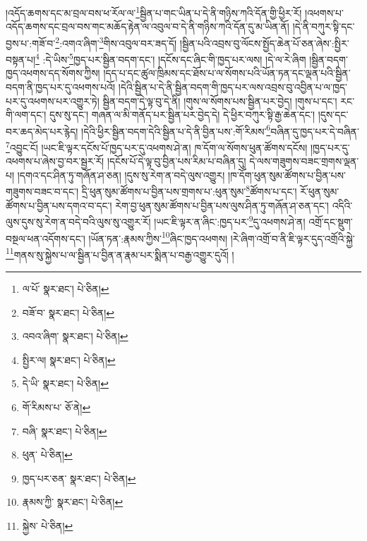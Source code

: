 །འདོད་ཆགས་དང་མ་བྲལ་བས་ཕ་རོལ་ལ་\footnote{ལ་པོ་  སྣར་ཐང་།  པེ་ཅིན། }སྦྱིན་པ་གང་ཡིན་པ་དེ་ནི་གཉིས་ཀའི་དོན་གྱི་ཕྱིར་རོ། །འཕགས་པ་འདོད་ཆགས་དང་བྲལ་བས་གང་མཆོད་རྟེན་ལ་འབུལ་བ་དེ་ནི་གཉིས་ཀའི་དོན་དུ་མ་ཡིན་ནོ། །དེ་ནི་བཀུར་སྟི་དང་བྱས་པ་:གཟོ་བ་\footnote{བཟོ་བ་  སྣར་ཐང་།  པེ་ཅིན། }:འགའ་ཞིག་\footnote{འབའ་ཞིག་  སྣར་ཐང་།  པེ་ཅིན། }གིས་འབུལ་བར་ཟད་དོ། །སྦྱིན་པའི་འབྲས་བུ་ལོངས་སྤྱོད་ཆེན་པོ་ཅན་ཞེས་:སྤྱིར་བསྟན་པ།\footnote{སྤྱིར་ལ།  སྣར་ཐང་།  པེ་ཅིན། } :དེ་ཡིས་\footnote{དེ་ཡི་  སྣར་ཐང་།  པེ་ཅིན། }ཁྱད་པར་སྦྱིན་བདག་དང་། །དངོས་དང་ཞིང་གི་ཁྱད་པར་ལས། །དེ་ལ་རེ་ཞིག །སྦྱིན་བདག་ཁྱད་འཕགས་དད་སོགས་ཀྱིས། །དད་པ་དང་ཚུལ་ཁྲིམས་དང་ཐོས་པ་ལ་སོགས་པའི་ཡོན་ཏན་དང་ལྡན་པའི་སྦྱིན་བདག་ནི་ཁྱད་པར་དུ་འཕགས་པའོ། །དེའི་སྦྱིན་པ་དེ་ནི་སྦྱིན་བདག་གི་ཁྱད་པར་ལས་འབྲས་བུ་འབྱིན་པ་ལ་ཁྱད་པར་དུ་འཕགས་པར་འགྱུར་ཏེ། སྦྱིན་བདག་དེ་ལྟ་བུ་དེ་ནི། །གུས་ལ་སོགས་པས་སྦྱིན་པར་བྱེད། །གུས་པ་དང་། རང་གི་ལག་དང་། དུས་སུ་དང་། གཞན་ལ་མི་གནོད་པར་སྦྱིན་པར་བྱེད་དེ། དེ་ཕྱིར་བཀུར་སྟི་རྒྱ་ཆེན་དང་། །དུས་དང་བར་ཆད་མེད་པར་རྙེད། །དེའི་ཕྱིར་སྦྱིན་བདག་དེའི་སྦྱིན་པ་དེ་ནི་བྱིན་པས་:གོ་རིམས་\footnote{གོ་རིམས་པ་  ཅོ་ནེ། }བཞིན་དུ་ཁྱད་པར་དེ་བཞིན་\footnote{བཞི་  སྣར་ཐང་།  པེ་ཅིན། }འབྱུང་ངོ། །ཡང་ཇི་ལྟར་དངོས་པོ་ཁྱད་པར་དུ་འཕགས་ཤེ་ན། ཁ་དོག་ལ་སོགས་ཕུན་ཚོགས་དངོས། །ཁྱད་པར་དུ་འཕགས་པ་ཞེས་བྱ་བར་སྦྱར་རོ། །དངོས་པོ་དེ་ལྟ་བུ་བྱིན་པས་རིམ་པ་བཞིན་དུ། དེ་ལས་གཟུགས་བཟང་གྲགས་ལྡན་པ། །དགའ་དང་ཤིན་ཏུ་གཞོན་ཤ་ཅན། །དུས་སུ་རེག་ན་བདེ་ལུས་འགྱུར། །ཁ་དོག་ཕུན་སུམ་ཚོགས་པ་བྱིན་པས་གཟུགས་བཟང་བ་དང་། དྲི་ཕུན་སུམ་ཚོགས་པ་བྱིན་པས་གྲགས་པ་:ཕུན་སུམ་\footnote{ཕུན་  པེ་ཅིན། }ཚོགས་པ་དང་། རོ་ཕུན་སུམ་ཚོགས་པ་བྱིན་པས་དགའ་བ་དང་། རེག་བྱ་ཕུན་སུམ་ཚོགས་པ་བྱིན་པས་ལུས་ཤིན་ཏུ་གཞོན་ཤ་ཅན་དང་། འདིའི་ལུས་དུས་སུ་རེག་ན་བདེ་བའི་ལུས་སུ་འགྱུར་རོ། །ཡང་ཇི་ལྟར་ན་ཞིང་:ཁྱད་པར་\footnote{ཁྱད་པར་ཅན་  སྣར་ཐང་།  པེ་ཅིན། }དུ་འཕགས་ཤེ་ན། འགྲོ་དང་སྡུག་བསྔལ་ཕན་འདོགས་དང་། །ཡོན་ཏན་:རྣམས་ཀྱིས་\footnote{རྣམས་ཀྱི་  སྣར་ཐང་།  པེ་ཅིན། }ཞིང་ཁྱད་འཕགས། །རེ་ཞིག་འགྲོ་བ་ནི་ཇི་ལྟར་དུད་འགྲོའི་སྐྱེ་\footnote{སྐྱེས་  པེ་ཅིན། }གནས་སུ་སྐྱེས་པ་ལ་སྦྱིན་པ་བྱིན་ན་རྣམ་པར་སྨིན་པ་བརྒྱ་འགྱུར་དུའོ། །
